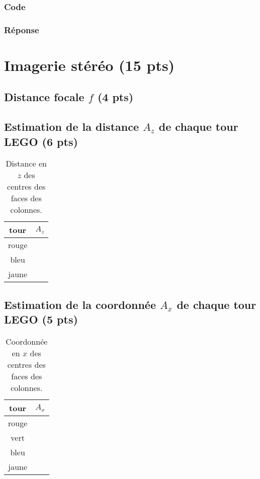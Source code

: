 \documentclass[12pt]{article}
\begin{document}
\subsubsection{Code}
\subsubsection{Réponse}

\newpage
\section{Imagerie stéréo  (15 pts)}

\subsection{Distance focale $f$ (4 pts)}

\subsection{Estimation de la distance $A_z$ de chaque tour LEGO (6 pts)}

\begin{table}[h]
\caption{Distance en $z$ des centres des faces des colonnes.}
\label{TableCoord}
\begin{center}
\begin{tabular}{|c|c|}
\hline
 tour     &    $A_z$ \\
\hline
 rouge      &                          \\
 bleu      &                            \\
jaune     &                         \\
\hline
\end{tabular}
\end{center}
\end{table}


\subsection{Estimation de la coordonnée $A_x$ de chaque tour LEGO (5 pts)}

\begin{table}[h]
\caption{Coordonnée en $x$ des centres des faces des colonnes.}
\label{TableX}
\begin{center}
\begin{tabular}{|c|c|}
\hline
 tour     &    $A_x$ \\
\hline
 rouge      &                          \\
 vert      &                           \\
 bleu     &                            \\
 jaune     &                         \\
\hline
\end{tabular}
\end{center}
\end{table}
\end{document}
